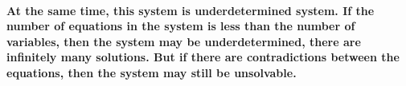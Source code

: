 \paragraph{At the same time, this system is underdetermined system. If the number of equations in the system is less than the number of variables, then the system may be underdetermined, there are infinitely many solutions. But if there are contradictions between the equations, then the system may still be unsolvable.}
